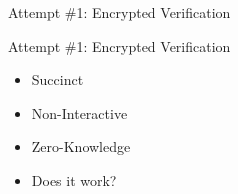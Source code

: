 \documentclass{zkdl-presentation-template}
\begin{document}
\begin{frame}{Attempt \#1: Encrypted Verification}
\begin{center}
        \end{center}
    \end{frame}

    \begin{frame}{Attempt \#1: Encrypted Verification}
        \begin{itemize}
            \item[\cmark] Succinct
            \item[\cmark] Non-Interactive
            \item[\cmark] Zero-Knowledge \pause
            \item[\xmark] \vspace{7pt} Does it work?
        \end{itemize}
    \end{frame}
\end{document}
